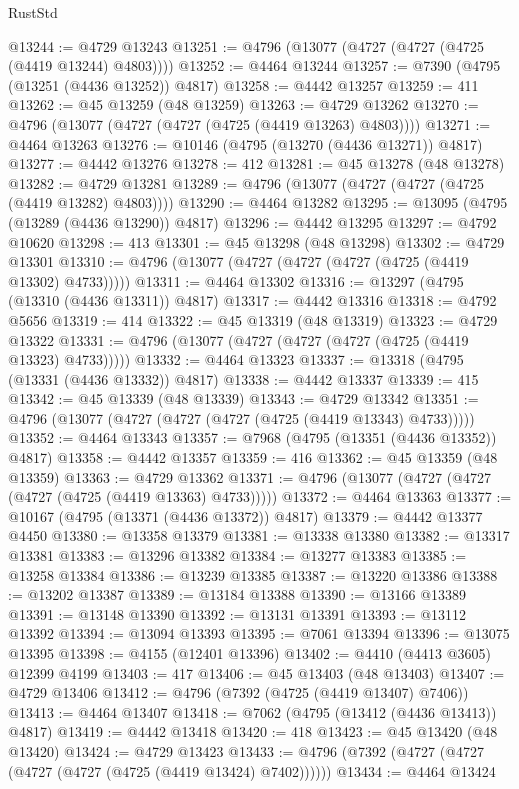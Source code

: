 \begin{lexlean}{RustStd}
\begin{coremodule}
@13244 := @4729 @13243
@13251 := @4796 (@13077 (@4727 (@4727 (@4725 (@4419 @13244) @4803))))
@13252 := @4464 @13244
@13257 := @7390 (@4795 (@13251 (@4436 @13252)) @4817)
@13258 := @4442 @13257
@13259 := 411
@13262 := @45 @13259 (@48 @13259)
@13263 := @4729 @13262
@13270 := @4796 (@13077 (@4727 (@4727 (@4725 (@4419 @13263) @4803))))
@13271 := @4464 @13263
@13276 := @10146 (@4795 (@13270 (@4436 @13271)) @4817)
@13277 := @4442 @13276
@13278 := 412
@13281 := @45 @13278 (@48 @13278)
@13282 := @4729 @13281
@13289 := @4796 (@13077 (@4727 (@4727 (@4725 (@4419 @13282) @4803))))
@13290 := @4464 @13282
@13295 := @13095 (@4795 (@13289 (@4436 @13290)) @4817)
@13296 := @4442 @13295
@13297 := @4792 @10620
@13298 := 413
@13301 := @45 @13298 (@48 @13298)
@13302 := @4729 @13301
@13310 := @4796 (@13077 (@4727 (@4727 (@4727 (@4725 (@4419 @13302) @4733)))))
@13311 := @4464 @13302
@13316 := @13297 (@4795 (@13310 (@4436 @13311)) @4817)
@13317 := @4442 @13316
@13318 := @4792 @5656
@13319 := 414
@13322 := @45 @13319 (@48 @13319)
@13323 := @4729 @13322
@13331 := @4796 (@13077 (@4727 (@4727 (@4727 (@4725 (@4419 @13323) @4733)))))
@13332 := @4464 @13323
@13337 := @13318 (@4795 (@13331 (@4436 @13332)) @4817)
@13338 := @4442 @13337
@13339 := 415
@13342 := @45 @13339 (@48 @13339)
@13343 := @4729 @13342
@13351 := @4796 (@13077 (@4727 (@4727 (@4727 (@4725 (@4419 @13343) @4733)))))
@13352 := @4464 @13343
@13357 := @7968 (@4795 (@13351 (@4436 @13352)) @4817)
@13358 := @4442 @13357
@13359 := 416
@13362 := @45 @13359 (@48 @13359)
@13363 := @4729 @13362
@13371 := @4796 (@13077 (@4727 (@4727 (@4727 (@4725 (@4419 @13363) @4733)))))
@13372 := @4464 @13363
@13377 := @10167 (@4795 (@13371 (@4436 @13372)) @4817)
@13379 := @4442 @13377 @4450
@13380 := @13358 @13379
@13381 := @13338 @13380
@13382 := @13317 @13381
@13383 := @13296 @13382
@13384 := @13277 @13383
@13385 := @13258 @13384
@13386 := @13239 @13385
@13387 := @13220 @13386
@13388 := @13202 @13387
@13389 := @13184 @13388
@13390 := @13166 @13389
@13391 := @13148 @13390
@13392 := @13131 @13391
@13393 := @13112 @13392
@13394 := @13094 @13393
@13395 := @7061 @13394
@13396 := @13075 @13395
@13398 := @4155 (@12401 @13396)
@13402 := @4410 (@4413 @3605) @12399 @4199
@13403 := 417
@13406 := @45 @13403 (@48 @13403)
@13407 := @4729 @13406
@13412 := @4796 (@7392 (@4725 (@4419 @13407) @7406))
@13413 := @4464 @13407
@13418 := @7062 (@4795 (@13412 (@4436 @13413)) @4817)
@13419 := @4442 @13418
@13420 := 418
@13423 := @45 @13420 (@48 @13420)
@13424 := @4729 @13423
@13433 := @4796 (@7392 (@4727 (@4727 (@4727 (@4727 (@4725 (@4419 @13424) @7402))))))
@13434 := @4464 @13424

\end{coremodule}
\end{lexlean}
